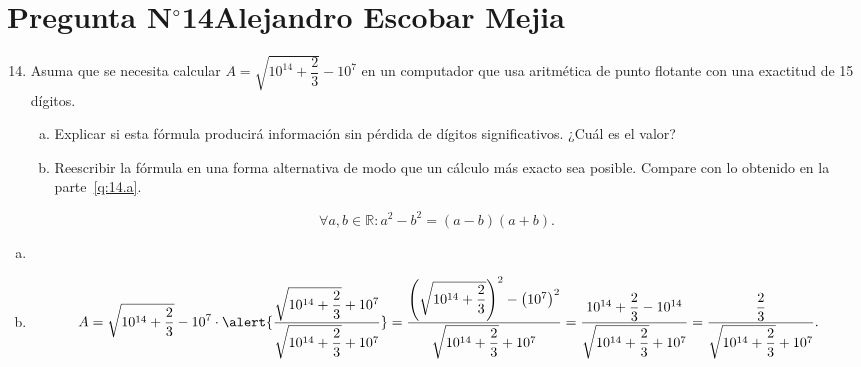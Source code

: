 \section{Pregunta N$^{\circ}$14\qquad Alejandro Escobar Mejia}

\begin{frame}
	\begin{enumerate}\setcounter{enumi}{13}
		\item

		      Asuma que se necesita calcular
		      \begin{math}
			      A=
			      \sqrt{10^{14}+\dfrac{2}{3}}-10^{7}
		      \end{math}
		      en un computador que usa aritmética de punto flotante con
		      una exactitud de 15 dígitos.

		      \begin{enumerate}[a)]
			      \item\label{q:14.a}

			      Explicar si esta fórmula producirá información sin
			      pérdida de dígitos significativos.
			      ¿Cuál es el valor?

			      \item\label{q:14.b}

			      Reescribir la fórmula en una forma alternativa de
			      modo que un cálculo más exacto sea posible.
			      Compare con lo obtenido en la parte~\eqref{q:14.a}.
		      \end{enumerate}
	\end{enumerate}

	\begin{solution}

		\begin{equation*}
			\forall a,b\in\mathbb{R}:
			a^{2}-b^{2}=
			\left(a-b\right)
			\left(a+b\right).
		\end{equation*}

		\begin{enumerate}[a)]
			\item

			\item

			      \begin{equation*}
				      A=
				      \sqrt{10^{14}+\dfrac{2}{3}}-10^{7}\cdot
				      \alert{
				      \dfrac{
				      \sqrt{10^{14}+\dfrac{2}{3}}+10^{7}
				      }{
				      \sqrt{10^{14}+\dfrac{2}{3}}+10^{7}
				      }
				      }=
				      \dfrac{
				      \left(
				      \sqrt{10^{14}+\dfrac{2}{3}}
				      \right)^{2}
				      -{\left(
				      10^{7}
				      \right)}^{2}
				      }{
				      \sqrt{10^{14}+\dfrac{2}{3}}+10^{7}
				      }
				      =
				      \dfrac{
				      10^{14}+\dfrac{2}{3}-10^{14}
				      }{
				      \sqrt{10^{14}+\dfrac{2}{3}}+10^{7}
				      }=
				      \dfrac{\dfrac{2}{3}}{
				      \sqrt{10^{14}+\dfrac{2}{3}}+10^{7}
				      }.
			      \end{equation*}
		\end{enumerate}
	\end{solution}
\end{frame}

